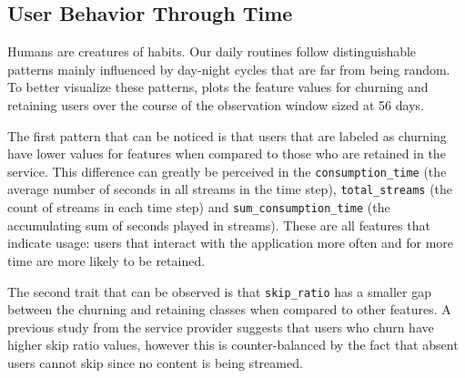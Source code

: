 \documentclass{kththesis}
\begin{document}
\subsection{User Behavior Through Time}

Humans are creatures of habits. Our daily routines follow distinguishable patterns mainly influenced by day-night cycles that are far from being random. To better visualize these patterns,  plots the feature values for churning and retaining users over the course of the observation window sized at 56 days. 

The first pattern that can be noticed is that users that are labeled as churning have lower values for features when compared to those who are retained in the service. This difference can greatly be perceived in the \verb|consumption_time| (the average number of seconds in all streams in the time step), \verb|total_streams| (the count of streams in each time step) and \verb|sum_consumption_time| (the accumulating sum of seconds played in streams). These are all features that indicate usage: users that interact with the application more often and for more time are more likely to be retained.

The second trait that can be observed is that \verb|skip_ratio| has a smaller gap between the churning and retaining classes when compared to other features. A previous study from the service provider suggests that users who churn have higher skip ratio values, however this is counter-balanced by the fact that absent users cannot skip since no content is being streamed.
	
\end{document}
